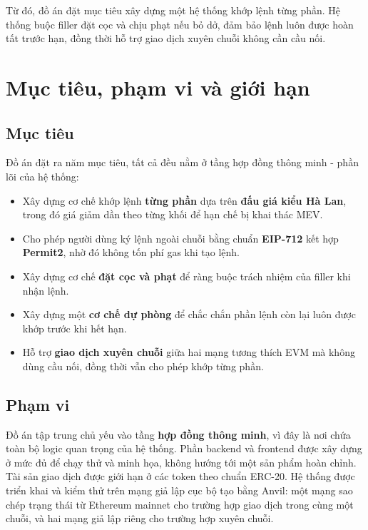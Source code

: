 \documentclass[../DoAn.tex]{subfiles}
\begin{document}
Từ đó, đồ án đặt mục tiêu xây dựng một hệ thống khớp lệnh từng phần. Hệ thống buộc filler đặt cọc và chịu phạt nếu bỏ dở, đảm bảo lệnh luôn được hoàn tất trước hạn, đồng thời hỗ trợ giao dịch xuyên chuỗi không cần cầu nối.

\section{Mục tiêu, phạm vi và giới hạn}
\label{section:1.2}

\subsection{Mục tiêu}
\label{subsection:1.2.1}

Đồ án đặt ra năm mục tiêu, tất cả đều nằm ở tầng hợp đồng thông minh - phần lõi của hệ thống:

\begin{itemize}
    \item Xây dựng cơ chế khớp lệnh \textbf{từng phần} dựa trên \textbf{đấu giá kiểu Hà Lan}, trong đó giá giảm dần theo từng khối để hạn chế bị khai thác MEV.
    \item Cho phép người dùng ký lệnh ngoài chuỗi bằng chuẩn \textbf{EIP-712} kết hợp \textbf{Permit2}, nhờ đó không tốn phí gas khi tạo lệnh.
    \item Xây dựng cơ chế \textbf{đặt cọc và phạt} để ràng buộc trách nhiệm của filler khi nhận lệnh.
    \item Xây dựng một \textbf{cơ chế dự phòng} để chắc chắn phần lệnh còn lại luôn được khớp trước khi hết hạn.
    \item Hỗ trợ \textbf{giao dịch xuyên chuỗi} giữa hai mạng tương thích EVM mà không dùng cầu nối, đồng thời vẫn cho phép khớp từng phần.
\end{itemize}

\subsection{Phạm vi}
\label{subsection:1.2.2}

Đồ án tập trung chủ yếu vào tầng \textbf{hợp đồng thông minh}, vì đây là nơi chứa toàn bộ logic quan trọng của hệ thống. Phần backend và frontend được xây dựng ở mức đủ để chạy thử và minh họa, không hướng tới một sản phẩm hoàn chỉnh. Tài sản giao dịch được giới hạn ở các token theo chuẩn ERC-20. Hệ thống được triển khai và kiểm thử trên mạng giả lập cục bộ tạo bằng Anvil: một mạng sao chép trạng thái từ Ethereum mainnet cho trường hợp giao dịch trong cùng một chuỗi, và hai mạng giả lập riêng cho trường hợp xuyên chuỗi.
\end{document}
